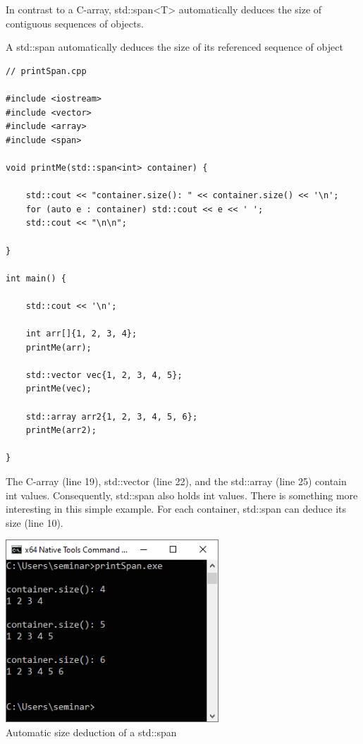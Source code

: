 
In contrast to a C-array, std::span<T> automatically deduces the size of contiguous sequences of objects.

\noindent
A std::span automatically deduces the size of its referenced sequence of object
\begin{lstlisting}[style=styleCXX]
// printSpan.cpp

#include <iostream>
#include <vector>
#include <array>
#include <span>

void printMe(std::span<int> container) {

	std::cout << "container.size(): " << container.size() << '\n';
	for (auto e : container) std::cout << e << ' ';
	std::cout << "\n\n";
	
}

int main() {

	std::cout << '\n';
	
	int arr[]{1, 2, 3, 4};
	printMe(arr);
	
	std::vector vec{1, 2, 3, 4, 5};
	printMe(vec);
	
	std::array arr2{1, 2, 3, 4, 5, 6};
	printMe(arr2);

}
\end{lstlisting}

The C-array (line 19), std::vector (line 22), and the std::array (line 25) contain int values. Consequently, std::span also holds int values. There is something more interesting in this simple example. For each container, std::span can deduce its size (line 10).

\begin{center}
\includegraphics[width=0.6\textwidth]{content/3/chapter5/images/5.png}\\
Automatic size deduction of a std::span
\end{center}

